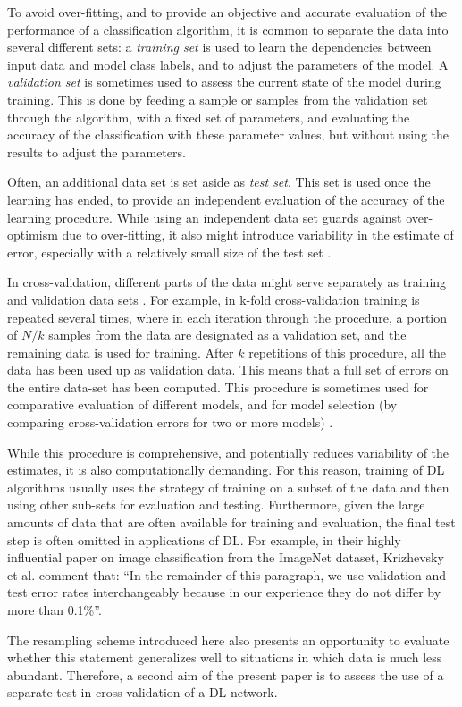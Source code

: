 To avoid over-fitting, and to provide an objective and accurate evaluation of
the performance of a classification algorithm, it is common to separate the data
into several different sets: a \emph{training set} is used to learn the
dependencies between input data and model class labels, and to adjust the
parameters of the model. A \emph{validation set} is sometimes used to assess the
current state of the model during training. This is done by feeding a sample or
samples from the validation set through the algorithm, with a fixed set of
parameters, and evaluating the accuracy of the classification with these
parameter values, but without using the results to adjust the parameters.

Often, an additional data set is set aside as \emph{test set}. This set is used
once the learning has ended, to provide an independent evaluation of the 
accuracy of the learning procedure. While using an independent data set guards 
against over-optimism due to over-fitting, it also might introduce 
variability in the estimate of error, especially with a relatively small size 
of the test set \citep{Efron1983-vu}.

In cross-validation, different parts of the data might serve separately as
training and validation data sets \citep{Stone1974-mo}. For example, in k-fold
cross-validation training is repeated several times, where in each iteration
through the procedure, a portion of $N/k$ samples from the data are designated
as a validation set, and the remaining data is used for training. After $k$
repetitions of this procedure, all the data has been used up as validation data.
This means that a full set of errors on the entire data-set has been computed.
This procedure is sometimes used for comparative evaluation of different models,
and for model selection (by comparing cross-validation errors for two or more
models) \citep{Stone1977-ez}.

While this procedure is comprehensive, and potentially reduces variability of
the estimates, it is also computationally demanding. For this reason, training
of DL algorithms usually uses the strategy of training on a subset of the data
and then using other sub-sets for evaluation and testing.  Furthermore, given
the large amounts of data that are often available for training and evaluation,
the final test step is often omitted in applications of DL. For example, in
their highly influential paper on image classification from the ImageNet
dataset, Krizhevsky et al. \citep{Krizhevsky2012-qc} comment that: ``In the
remainder of this paragraph, we use validation and test error rates
interchangeably because in our experience they do not differ by more than
0.1\%''.

The resampling scheme introduced here also presents an opportunity to evaluate
whether this statement generalizes well to situations in which data is much less
abundant. Therefore, a second aim of the present paper is to assess the use of a
separate test in cross-validation of a DL network.
